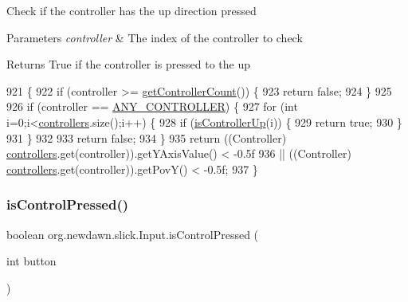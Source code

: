 Check if the controller has the up direction pressed


\begin{DoxyParams}{Parameters}
{\em controller} & The index of the controller to check \\
\hline
\end{DoxyParams}
\begin{DoxyReturn}{Returns}
True if the controller is pressed to the up 
\end{DoxyReturn}

\begin{DoxyCode}
921                                                   \{
922         \textcolor{keywordflow}{if} (controller >= \mbox{\hyperlink{classorg_1_1newdawn_1_1slick_1_1_input_a4a81c87f7d16d49471106d7fbaa0989d}{getControllerCount}}()) \{
923             \textcolor{keywordflow}{return} \textcolor{keyword}{false};
924         \}
925 
926         \textcolor{keywordflow}{if} (controller == \mbox{\hyperlink{classorg_1_1newdawn_1_1slick_1_1_input_a1f3df3cf41eaf8ae3bdf194d5cf96dd0}{ANY\_CONTROLLER}}) \{
927             \textcolor{keywordflow}{for} (\textcolor{keywordtype}{int} i=0;i<\mbox{\hyperlink{classorg_1_1newdawn_1_1slick_1_1_input_a1bcc91bf0db9efc578bd934a8ed9ce67}{controllers}}.size();i++) \{
928                 \textcolor{keywordflow}{if} (\mbox{\hyperlink{classorg_1_1newdawn_1_1slick_1_1_input_a222f2a8caf403540d14050698bfc4415}{isControllerUp}}(i)) \{
929                     \textcolor{keywordflow}{return} \textcolor{keyword}{true};
930                 \}
931             \}
932             
933             \textcolor{keywordflow}{return} \textcolor{keyword}{false};
934         \}
935         \textcolor{keywordflow}{return} ((Controller) \mbox{\hyperlink{classorg_1_1newdawn_1_1slick_1_1_input_a1bcc91bf0db9efc578bd934a8ed9ce67}{controllers}}.get(controller)).getYAxisValue() < -0.5f
936                 || ((Controller) \mbox{\hyperlink{classorg_1_1newdawn_1_1slick_1_1_input_a1bcc91bf0db9efc578bd934a8ed9ce67}{controllers}}.get(controller)).getPovY() < -0.5f;
937     \}
\end{DoxyCode}
\mbox{\label{classorg_1_1newdawn_1_1slick_1_1_input_a615a7b4159951d7b0f041b7df823b3fd}} 
\subsubsection{\texorpdfstring{is\+Control\+Pressed()}{isControlPressed()}\hspace{0.1cm}{\footnotesize\ttfamily [1/2]}}
{\footnotesize\ttfamily boolean org.\+newdawn.\+slick.\+Input.\+is\+Control\+Pressed (\begin{DoxyParamCaption}\item[{int}]{button }\end{DoxyParamCaption})\hspace{0.3cm}{\ttfamily [inline]}}

